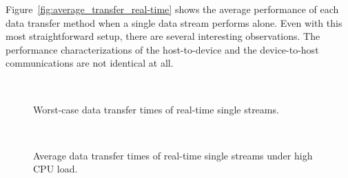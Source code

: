 Figure~\ref{fig:average_transfer_real-time} shows the average
performance of each data transfer method when a single data stream
performs alone.
Even with this most straightforward setup, there are several interesting
observations.
The performance characterizations of the host-to-device and the
device-to-host communications are not identical at all.

\begin{figure}[!t]
 \centering
 \\
 \caption{Worst-case data transfer times of real-time single streams.}
 \label{fig:worst_case_transfer_real-time}
\end{figure}

\begin{figure}[!t]
 \centering
 \\
 \caption{Average data transfer times of real-time single streams
 under high CPU load.}
 \label{fig:average_transfer_cpuload_real-time}
\end{figure}

